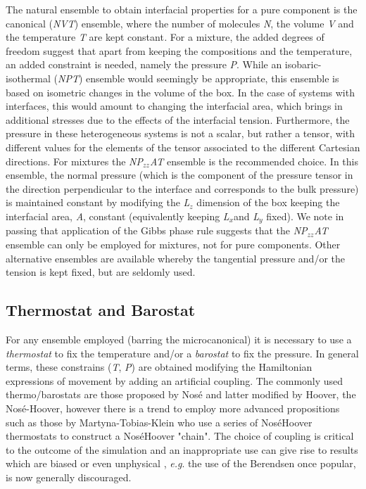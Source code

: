 \documentclass[9pt,bestpractices]{livecoms}
\begin{document}
The natural ensemble to obtain interfacial properties for a pure component is
the canonical (\textit{NVT}) ensemble, where the number of molecules
\textit{N}, the volume \textit{V} and the temperature \textit{T} are kept
constant\textit{.} For a mixture, the added degrees of freedom suggest that
apart from keeping the compositions and the temperature, an added constraint is
needed, namely the pressure \textit{P}. While an isobaric-isothermal
(\textit{NPT}) ensemble would seemingly be appropriate, this ensemble is based
on isometric changes in the volume of the box. In the case of systems with
interfaces, this would amount to changing the interfacial area, which brings in
additional stresses due to the effects of the interfacial tension. Furthermore,
the pressure in these heterogeneous systems is not a scalar, but rather
a tensor, with different values for the elements of the tensor associated to
the different Cartesian directions.  For mixtures the
\textit{NP}$_{zz}$\textit{AT} ensemble is the recommended choice. In this
ensemble, the normal pressure (which is the component of the pressure tensor in
the direction perpendicular to the interface and corresponds to the bulk
pressure) is maintained constant by modifying the \textit{L}$_{z}$ dimension of
the box keeping the interfacial area, \textit{A}, constant (equivalently
keeping \textit{L}$_{x }$and \textit{L}$_{y}$ fixed). We note in passing that
application of the Gibbs phase rule suggests that the
\textit{NP}$_{zz}$\textit{AT} ensemble can only be employed for mixtures, not
for pure components. Other alternative ensembles are available
\citep{zhang1995} whereby the tangential pressure and/or the tension
is kept fixed, but are seldomly used.  

\subsection{Thermostat and Barostat}
For any ensemble employed (barring the microcanonical) it is necessary to use
a \textit{thermostat} to fix the temperature and/or a \textit{barostat} to fix
the pressure. In general terms, these constrains (\textit{T}, \textit{P}) are
obtained modifying the Hamiltonian expressions of movement by adding an
artificial coupling. The commonly used thermo/barostats are those proposed by
Nos\'{e} and latter modified by Hoover, the Nos\'{e}-Hoover\citep{hoover1985},
however there is a trend to employ more advanced propositions such as
those by Martyna-Tobias-Klein \citep{martyna1992} who use a series of
Nos\'{e}\textendash{}Hoover thermostats to construct
a Nos\'{e}\textendash{}Hoover "chain".  The choice of coupling is critical to
the outcome of the simulation \citep{shirts2013}
and an inappropriate use can give rise to results which are biased
or even unphysical \citep{wong2016}, \textit{e.g}. the use of
the Berendsen \citep{berendsen1984}
once popular, is now generally discouraged.
\end{document}
